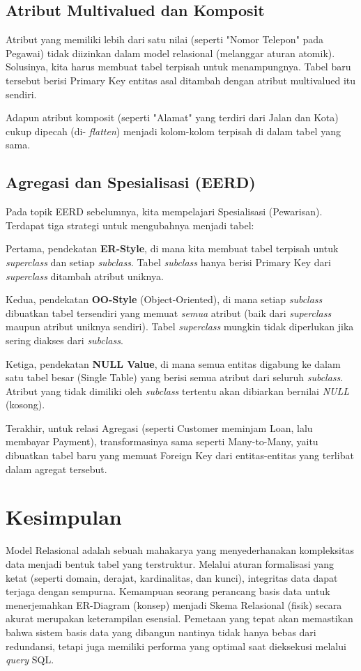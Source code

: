 \documentclass[11pt,a4paper]{article}
\begin{document}
\subsection{Atribut Multivalued dan Komposit}
Atribut yang memiliki lebih dari satu nilai (seperti "Nomor Telepon" pada Pegawai) tidak diizinkan dalam model relasional (melanggar aturan atomik). Solusinya, kita harus membuat tabel terpisah untuk menampungnya. Tabel baru tersebut berisi Primary Key entitas asal ditambah dengan atribut multivalued itu sendiri.

Adapun atribut komposit (seperti "Alamat" yang terdiri dari Jalan dan Kota) cukup dipecah (di- \textit{flatten}) menjadi kolom-kolom terpisah di dalam tabel yang sama.

\subsection{Agregasi dan Spesialisasi (EERD)}
Pada topik EERD sebelumnya, kita mempelajari Spesialisasi (Pewarisan). Terdapat tiga strategi untuk mengubahnya menjadi tabel:

Pertama, pendekatan \textbf{ER-Style}, di mana kita membuat tabel terpisah untuk \textit{superclass} dan setiap \textit{subclass}. Tabel \textit{subclass} hanya berisi Primary Key dari \textit{superclass} ditambah atribut uniknya.

Kedua, pendekatan \textbf{OO-Style} (Object-Oriented), di mana setiap \textit{subclass} dibuatkan tabel tersendiri yang memuat \textit{semua} atribut (baik dari \textit{superclass} maupun atribut uniknya sendiri). Tabel \textit{superclass} mungkin tidak diperlukan jika sering diakses dari \textit{subclass}.

Ketiga, pendekatan \textbf{NULL Value}, di mana semua entitas digabung ke dalam satu tabel besar (Single Table) yang berisi semua atribut dari seluruh \textit{subclass}. Atribut yang tidak dimiliki oleh \textit{subclass} tertentu akan dibiarkan bernilai \textit{NULL} (kosong).

Terakhir, untuk relasi Agregasi (seperti Customer meminjam Loan, lalu membayar Payment), transformasinya sama seperti Many-to-Many, yaitu dibuatkan tabel baru yang memuat Foreign Key dari entitas-entitas yang terlibat dalam agregat tersebut.

\section{Kesimpulan}

Model Relasional adalah sebuah mahakarya yang menyederhanakan kompleksitas data menjadi bentuk tabel yang terstruktur. Melalui aturan formalisasi yang ketat (seperti domain, derajat, kardinalitas, dan kunci), integritas data dapat terjaga dengan sempurna. Kemampuan seorang perancang basis data untuk menerjemahkan ER-Diagram (konsep) menjadi Skema Relasional (fisik) secara akurat merupakan keterampilan esensial. Pemetaan yang tepat akan memastikan bahwa sistem basis data yang dibangun nantinya tidak hanya bebas dari redundansi, tetapi juga memiliki performa yang optimal saat dieksekusi melalui \textit{query} SQL.
\end{document}
